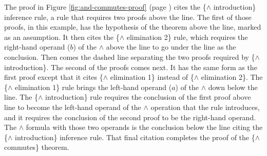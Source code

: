 The proof in
Figure \ref{fig:and-commutes-proof} (page \pageref{fig:and-commutes-proof})
cites the \{$\wedge$ introduction\} inference rule,
a rule that requires two proofs above the line.
The first of those proofs, in this example, has the hypothesis
of the theorem above the line, marked as an assumption.
It then cites the \{$\wedge$ elimination 2\} rule,
which requires the right-hand operand ($b$) of the $\wedge$
above the line to go under the line as the conclusion.
Then comes the dashed line separating
the two proofs required by \{$\wedge$ introduction\}.
The second of the proofs comes next.
It has the same form as the first proof
except that it cites \{$\wedge$ elimination 1\} instead of \{$\wedge$ elimination 2\}.
The \{$\wedge$ elimination 1\} rule brings the left-hand operand ($a$) of the $\wedge$
down below the line.
The \{$\wedge$ introduction\} rule requires the
conclusion of the first proof above line to
become the left-hand operand of the $\wedge$
operation that the rule introduces,
and it requires the conclusion of the second
proof to be the right-hand operand.
The $\wedge$ formula with those two operands
is the conclusion below the line citing the \{$\wedge$ introduction\} inference rule.
That final citation completes the proof of the \{$\wedge$ commutes\} theorem.


